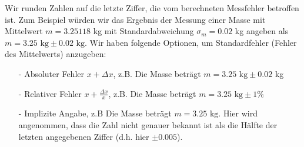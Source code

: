 Wir runden Zahlen auf die letzte Ziffer, die vom berechneten Messfehler betroffen ist. Zum Beispiel würden wir das Ergebnis der Messung einer Masse mit Mittelwert $m = 3.25118$ kg mit Standardabweichung $\sigma_m =0.02$ kg angeben als $m=3.25\text{ kg}\pm 0.02  
 \text{ kg}$. Wir haben folgende Optionen, um Standardfehler (Fehler des Mittelwerts) anzugeben:
 \begin{enumerate}
     \item[-] Absoluter Fehler $x + \Delta x$, z.B. Die Masse beträgt $m=3.25\text{ kg}\pm 0.02$ kg  
     \item[-] Relativer Fehler  $x + \frac{\Delta x}{x}$, z.B. Die Masse beträgt $m=3.25\text{ kg}\pm 1\%$ 
     \item[-] Implizite Angabe, z.B Die Masse beträgt $m=3.25\text{ kg}$. Hier wird angenommen, dass die Zahl nicht genauer bekannt ist als die Hälfte der letzten angegebenen Ziffer (d.h. hier $\pm 0.005$).
 \end{enumerate}


\newpage


